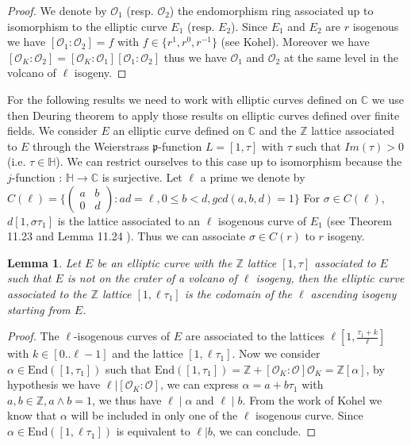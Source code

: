 \documentclass{lms}
\newtheorem{lem}[thm]{Lemma}
\begin{document}
\begin{proof}
We denote by $\mathcal{O}_1$ (resp. $\mathcal{O}_2$) the endomorphism ring associated up to isomorphism to the elliptic curve $E_1$ (resp. $E_2$). Since $E_1$ and $E_2$ are $r$ isogenous we have $[\mathcal{O}_1:\mathcal{O}_2]=f$ with $f \in \{r^1,r^0,r^{-1}\}$ (see Kohel). Moreover we have $[\mathcal{O}_K:\mathcal{O}_2]=[\mathcal{O}_K:\mathcal{O}_1][\mathcal{O}_1:\mathcal{O}_2]$ thus we have $\mathcal{O}_1$ and $\mathcal{O}_2$ at the same level in the volcano of $\ell$ isogeny.
\end{proof}  

For the following results we need to work with elliptic curves defined on $\mathbb{C}$ we use then Deuring theorem to apply those results on elliptic curves defined over finite fields.
We consider $E$ an elliptic curve defined on $\mathbb{C}$ and the $\mathbb{Z}$ lattice associated to $E$ through the Weierstrass $\mathfrak{p}$-function $L=[1,\tau]$ with $\tau$ such that $Im(\tau)>0$(i.e. $\tau \in \mathbb{H}$). We can restrict ourselves to this case up to isomorphism because the $j$-function : $\mathbb{H} \rightarrow \mathbb{C}$ is surjective. Let $\ell$ a prime we denote by
$C(\ell)=\{\left(\begin{array}{cc}
a & b\\
0 & d
\end{array}\right): ad= \ell,0\leqslant b <d, gcd(a,b,d)=1\}$
 For $\sigma \in C(\ell)$, $d[1,\sigma \tau_1]$ is the lattice associated to an $\ell$ isogenous curve of $E_1$ (see Theorem 11.23 and Lemma 11.24 \cite{Cox89}). Thus we can associate $\sigma \in C(r)$ to $r$ isogeny.



\begin{lem} 
Let $E$ be an elliptic curve with the $\mathbb{Z} $ lattice $[1,\tau ]$ associated to $E$ such that $E$ is not on the crater of a volcano of $\ell$ isogeny, then the elliptic curve associated to the $\mathbb{Z}$ lattice $ [ 1, \ell \tau_1 ] $ is the codomain of the $\ell$ ascending isogeny starting from $E$. 
\end{lem}

\begin{proof}
The $\ell$-isogenous curves of $E$ are associated to the lattices $\ell[1,\frac{\tau_1+k}{\ell}]$ with $k \in [0..\ell-1]$ and the lattice $[1,\ell \tau_1]$. Now we consider $\alpha \in \mathrm{End}([1,\tau_1])$ such that $\mathrm{End}([1,\tau_1])= \mathbb{Z} + [\mathcal{O}_K:\mathcal{O}]\mathcal{O}_K=\mathbb{Z}[\alpha]$, by hypothesis we have $\ell | [\mathcal{O}_K:\mathcal{O}]$, we can express $\alpha = a + b \tau_1$ with $a,b \in \mathbb{Z}, a \wedge b =1$, we thus have $\ell \mid \alpha$ and $\ell \mid b$. From the work of Kohel \cite{Kohel} we know that $\alpha$ will be included in only one of the $\ell$ isogenous curve. Since $\alpha \in \mathrm{End}([1,\ell\tau_1]) $ is equivalent to $\ell | b$, we can conclude.
\end{proof}
\end{document}
